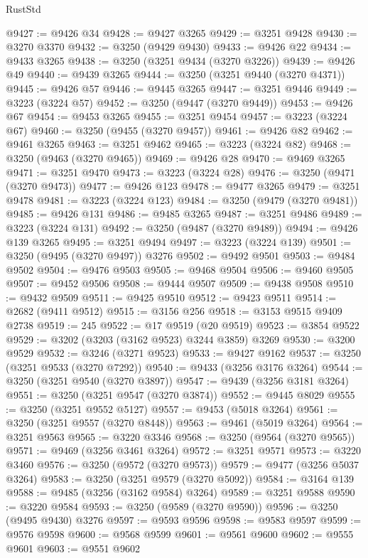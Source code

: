 \begin{lexlean}{RustStd}
\begin{coremodule}
@9427 := @9426 @34
@9428 := @9427 @3265
@9429 := @3251 @9428
@9430 := @3270 @3370
@9432 := @3250 (@9429 @9430)
@9433 := @9426 @22
@9434 := @9433 @3265
@9438 := @3250 (@3251 @9434 (@3270 @3226))
@9439 := @9426 @49
@9440 := @9439 @3265
@9444 := @3250 (@3251 @9440 (@3270 @4371))
@9445 := @9426 @57
@9446 := @9445 @3265
@9447 := @3251 @9446
@9449 := @3223 (@3224 @57)
@9452 := @3250 (@9447 (@3270 @9449))
@9453 := @9426 @67
@9454 := @9453 @3265
@9455 := @3251 @9454
@9457 := @3223 (@3224 @67)
@9460 := @3250 (@9455 (@3270 @9457))
@9461 := @9426 @82
@9462 := @9461 @3265
@9463 := @3251 @9462
@9465 := @3223 (@3224 @82)
@9468 := @3250 (@9463 (@3270 @9465))
@9469 := @9426 @28
@9470 := @9469 @3265
@9471 := @3251 @9470
@9473 := @3223 (@3224 @28)
@9476 := @3250 (@9471 (@3270 @9473))
@9477 := @9426 @123
@9478 := @9477 @3265
@9479 := @3251 @9478
@9481 := @3223 (@3224 @123)
@9484 := @3250 (@9479 (@3270 @9481))
@9485 := @9426 @131
@9486 := @9485 @3265
@9487 := @3251 @9486
@9489 := @3223 (@3224 @131)
@9492 := @3250 (@9487 (@3270 @9489))
@9494 := @9426 @139 @3265
@9495 := @3251 @9494
@9497 := @3223 (@3224 @139)
@9501 := @3250 (@9495 (@3270 @9497)) @3276
@9502 := @9492 @9501
@9503 := @9484 @9502
@9504 := @9476 @9503
@9505 := @9468 @9504
@9506 := @9460 @9505
@9507 := @9452 @9506
@9508 := @9444 @9507
@9509 := @9438 @9508
@9510 := @9432 @9509
@9511 := @9425 @9510
@9512 := @9423 @9511
@9514 := @2682 (@9411 @9512)
@9515 := @3156 @256
@9518 := @3153 @9515 @9409 @2738
@9519 := 245
@9522 := @17 @9519 (@20 @9519)
@9523 := @3854 @9522
@9529 := @3202 (@3203 (@3162 @9523) @3244 @3859) @3269
@9530 := @3200 @9529
@9532 := @3246 (@3271 @9523)
@9533 := @9427 @9162
@9537 := @3250 (@3251 @9533 (@3270 @7292))
@9540 := @9433 (@3256 @3176 @3264)
@9544 := @3250 (@3251 @9540 (@3270 @3897))
@9547 := @9439 (@3256 @3181 @3264)
@9551 := @3250 (@3251 @9547 (@3270 @3874))
@9552 := @9445 @8029
@9555 := @3250 (@3251 @9552 @5127)
@9557 := @9453 (@5018 @3264)
@9561 := @3250 (@3251 @9557 (@3270 @8448))
@9563 := @9461 (@5019 @3264)
@9564 := @3251 @9563
@9565 := @3220 @3346
@9568 := @3250 (@9564 (@3270 @9565))
@9571 := @9469 (@3256 @3461 @3264)
@9572 := @3251 @9571
@9573 := @3220 @3460
@9576 := @3250 (@9572 (@3270 @9573))
@9579 := @9477 (@3256 @5037 @3264)
@9583 := @3250 (@3251 @9579 (@3270 @5092))
@9584 := @3164 @139
@9588 := @9485 (@3256 (@3162 @9584) @3264)
@9589 := @3251 @9588
@9590 := @3220 @9584
@9593 := @3250 (@9589 (@3270 @9590))
@9596 := @3250 (@9495 @9430) @3276
@9597 := @9593 @9596
@9598 := @9583 @9597
@9599 := @9576 @9598
@9600 := @9568 @9599
@9601 := @9561 @9600
@9602 := @9555 @9601
@9603 := @9551 @9602

\end{coremodule}
\end{lexlean}
